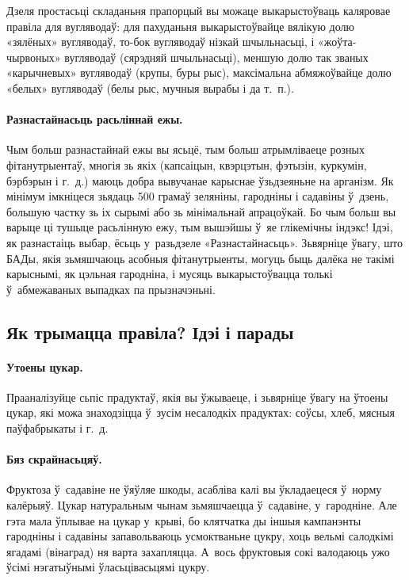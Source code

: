 Дзеля простасьці складаньня прапорцый вы можаце выкарыстоўваць каляровае правіла для вугляводаў: для пахуданьня выкарыстоўвайце вялікую долю «зялёных» вугляводаў, то-бок вугляводаў нізкай шчыльнасьці, і «жоўта-чырвоных» вугляводаў (сярэдняй шчыльнасьці), меншую долю так званых «карычневых» вугляводаў (крупы, буры рыс), максімальна абмяжоўвайце долю «белых» вугляводаў (белы рыс, мучныя вырабы і да т.~п.).

\paragraph{Разнастайнасьць расьліннай ежы.}
Чым больш разнастайнай ежы вы ясьцё, тым больш атрымліваеце розных фітанутрыентаў, многія зь якіх (капсаіцын, квэрцэтын, фэтызін, куркумін, бэрбэрын і г.~д.) маюць добра вывучанае карыснае ўзьдзеяньне на арганізм. Як мінімум імкніцеся зьядаць 500 грамаў зеляніны, гародніны і садавіны ў~дзень, большую частку зь іх сырымі або зь мінімальнай апрацоўкай. Бо чым больш вы варыце ці тушыце расьлінную ежу, тым вышэйшы ў~яе глікемічны індэкс! Ідэі, як разнастаіць выбар, ёсьць у~разьдзеле «Разнастайнасьць». Зьвярніце ўвагу, што БАДы, якія зьмяшчаюць асобныя фітанутрыенты, могуць быць далёка не такімі карыснымі, як цэльная гародніна, і мусяць выкарыстоўвацца толькі ў~абмежаваных выпадках па прызначэньні.

\subsection{Як трымацца правіла? Ідэі і парады}

\paragraph{Утоены цукар.}
Прааналізуйце сьпіс прадуктаў, якія вы ўжываеце, і зьвярніце ўвагу на ўтоены цукар, які можа знаходзіцца ў~зусім несалодкіх прадуктах: соўсы, хлеб, мясныя паўфабрыкаты і г.~д.

\paragraph{Бяз скрайнасьцяў.}
Фруктоза ў~садавіне не ўяўляе шкоды, асабліва калі вы ўкладаецеся ў~норму калёрыяў. Цукар натуральным чынам зьмяшчаецца ў~садавіне, у~гародніне. Але гэта мала ўплывае на цукар у~крыві, бо клятчатка ды іншыя кампанэнты гародніны і садавіны запавольваюць усмоктваньне цукру, хоць вельмі салодкімі ягадамі (вінаград) ня варта захапляцца. А~вось фруктовыя сокі валодаюць ужо ўсімі нэгатыўнымі ўласьцівасьцямі цукру.

